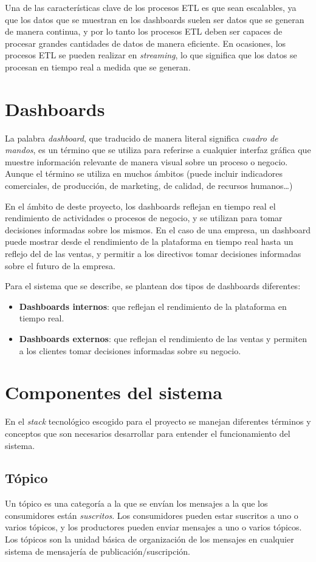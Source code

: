 Una de las características clave de los procesos ETL es que sean escalables, ya que los datos
que se muestran en los dashboards suelen ser datos que se generan de manera continua, y por
lo tanto los procesos ETL deben ser capaces de procesar grandes cantidades de datos de manera
eficiente. En ocasiones, los procesos ETL se pueden realizar en \textit{streaming}, lo que
significa que los datos se procesan en tiempo real a medida que se generan.

\section{Dashboards}\label{sec:dashboards}
La palabra \textit{dashboard}, que traducido de manera literal significa \textit{cuadro de mandos},
es un término que se utiliza para referirse a cualquier interfaz gráfica que muestre información
relevante de manera visual sobre un proceso o negocio. Aunque el término se utiliza en
muchos ámbitos (puede incluir indicadores comerciales, de producción, de marketing, de
calidad, de recursos humanos\ldots)

En el ámbito de deste proyecto, los dashboards reflejan en tiempo real el rendimiento de
actividades o procesos de negocio, y se utilizan para tomar decisiones informadas sobre los
mismos. En el caso de una empresa, un dashboard puede mostrar desde el rendimiento de la
plataforma en tiempo real hasta un reflejo del de las ventas, y permitir a los directivos tomar
decisiones informadas sobre el futuro de la empresa.

Para el sistema que se describe, se plantean dos tipos de dashboards diferentes:
\begin{itemize}
	\item \textbf{Dashboards internos}: que reflejan el rendimiento de la plataforma en tiempo real.
	\item \textbf{Dashboards externos}: que reflejan el rendimiento de las ventas y permiten a los
	      clientes tomar decisiones informadas sobre su negocio.
\end{itemize}
\newpage{}
\section{Componentes del sistema}\label{sec:componentes}
En el \textit{stack} tecnológico escogido para el proyecto se manejan
diferentes términos y conceptos que son necesarios desarrollar para
entender el funcionamiento del sistema.

\subsection{Tópico}\label{subsec:topico}
Un tópico es una categoría a la que se envían los mensajes a la que los consumidores están
\textit{suscritos}. Los consumidores pueden estar suscritos a uno o varios tópicos, y los
productores pueden enviar mensajes a uno o varios tópicos. Los tópicos son la unidad básica
de organización de los mensajes en cualquier sistema de mensajería de publicación/suscripción.

